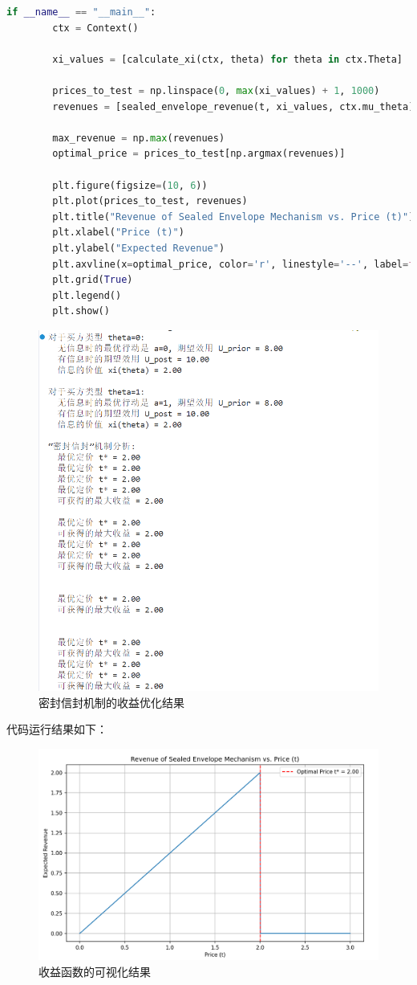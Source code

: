 \begin{lstlisting}[language=Python,style=pythonstyle]
    if __name__ == "__main__":
        ctx = Context()

        xi_values = [calculate_xi(ctx, theta) for theta in ctx.Theta]

        prices_to_test = np.linspace(0, max(xi_values) + 1, 1000)
        revenues = [sealed_envelope_revenue(t, xi_values, ctx.mu_theta) for t in prices_to_test]
        
        max_revenue = np.max(revenues)
        optimal_price = prices_to_test[np.argmax(revenues)]
    
        plt.figure(figsize=(10, 6))
        plt.plot(prices_to_test, revenues)
        plt.title("Revenue of Sealed Envelope Mechanism vs. Price (t)")
        plt.xlabel("Price (t)")
        plt.ylabel("Expected Revenue")
        plt.axvline(x=optimal_price, color='r', linestyle='--', label=f'Optimal Price t* = {optimal_price:.2f}')
        plt.grid(True)
        plt.legend()
        plt.show()    
\end{lstlisting}

\begin{figure}[H]
    \centering
    \includegraphics[width=0.6\linewidth]{image15.png}
    \caption{密封信封机制的收益优化结果}
    \label{fig:result}
\end{figure}

代码运行结果如下：
\begin{figure}[H]
    \centering
    \includegraphics[width=0.5\linewidth]{image14.png}
    \caption{收益函数的可视化结果}
    \label{fig:visualization}
\end{figure}

